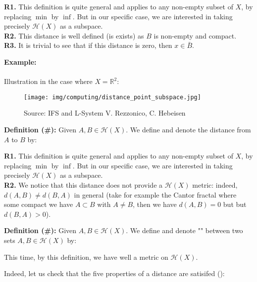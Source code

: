	\begin{tcolorbox}[title=Remarks,colframe=black,arc=10pt]
	\textbf{R1.} This definition is quite general and applies to any non-empty subset of $X$, by replacing $\min$ by $\inf$. But in our specific case, we are interested in taking precisely $\mathcal{H}(X)$ as a subspace.\\
	
	\textbf{R2.} This distance is well defined (is exists) as $B$ is non-empty and compact.\\
	
	\textbf{R3.} It is trivial to see that if this distance is zero, then $x\in\bar{B}$.
	\end{tcolorbox}
	\begin{tcolorbox}[colframe=black,colback=white,sharp corners]
	\textbf{{\Large {}}Example:}\\\\
	Illustration in the case where $X=\mathbb{R}^2$:
	\begin{figure}[H]
		\centering
		\texttt{[image: img/computing/distance\_point\_subspace.jpg]}
		\caption[]{Source: IFS and L-System V. Rezzonico, C. Hebeisen}
	\end{figure}
	\end{tcolorbox}
	\textbf{Definition (\#\mydef):} Given $A,B\in\mathcal{H}(X)$. We define and denote the distance from $A$ to $B$ by:
	
	\begin{tcolorbox}[title=Remarks,colframe=black,arc=10pt]
	\textbf{R1.} This definition is quite general and applies to any non-empty subset of $X$, by replacing $\min$ by $\inf$. But in our specific case, we are interested in taking precisely $\mathcal{H}(X)$ as a subspace.\\
	
	\textbf{R2.} We notice that this distance does not provide a $\mathcal{H}(X)$ metric: indeed, $d(A,B)\neq d(B,A)$ in general (take for example the Cantor fractal where some compact we have $A\subset B$ with $A\neq B$, then we have $d(A, B) = 0$ but but $d(B,A)>0$).
	\end{tcolorbox}
	\textbf{Definition (\#\mydef):} Given $A,B\in\mathcal{H}(X)$. We define and denote "" between two sets $A,B\in \mathcal{H}(X)$ by:
	
	This time, by this definition, we have well a metric on $\mathcal{H}(X)$.

	Indeed, let us check that the five properties of a distance are satisifed ():
	
